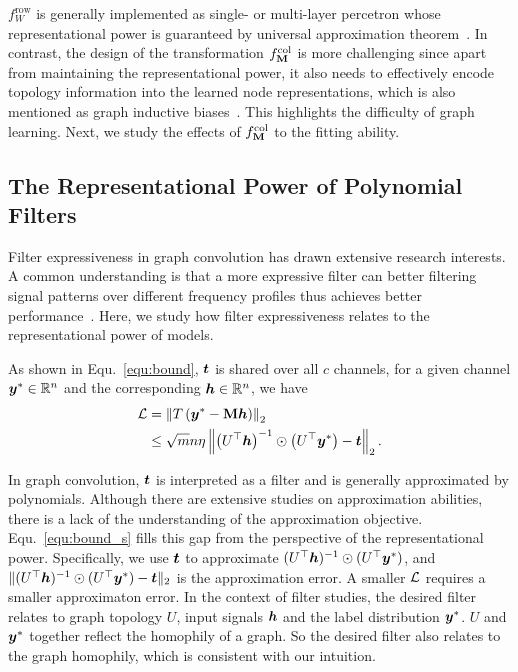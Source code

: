 \documentclass{article} %
\begin{document}
	$f_W^{\mathrm{row}}$ is generally implemented as single- or multi-layer percetron whose representational power is guaranteed by universal approximation theorem~\citep{hornik1989multilayer,cybenko1989approximation}.
	In contrast, the design of the transformation $f_{{\mathbf{M}}}^{\mathrm{col}}$ is more challenging since apart from maintaining the representational power, it also needs to effectively encode topology information into the learned node representations, which is also mentioned as graph inductive biases~\citep{ma2023graph}.
	This highlights the difficulty of graph learning.
	Next, we study the effects of $f_{{\mathbf{M}}}^{\mathrm{col}}$ to the fitting ability.
	
	\subsection{The Representational Power of Polynomial Filters}
	Filter expressiveness in graph convolution has drawn extensive research interests.
	A common understanding is that a more expressive filter can better filtering signal patterns over different frequency profiles thus achieves better performance~\citep{chien2021adaptive,he2021bernnet,JacobiConv,yang2022spectrum,bo2022specformer}.
	Here, we study how filter expressiveness relates to the representational power of models.
	
	As shown in Equ.~\ref{equ:bound}, ${\bm{t}}$ is shared over all $c$ channels, for a given channel ${\bm{y}}^*\in{\mathbb{R}}^n$ and the corresponding ${\bm{h}}\in{\mathbb{R}}^n$, we have
	\begin{equation}
		\label{equ:bound_s}
		\begin{aligned}
			{\mathcal{L}}&=\left\|T\left({\bm{y}}^*-{\mathbf{M}}{\bm{h}}\right)\right\|_2\\
			&\leq\sqrt{m}n\eta\left\|\left(U^{\top}{\bm{h}}\right)^{-1}\odot\left(U^{\top}{\bm{y}}^*\right)-{\bm{t}}\right\|_2.
		\end{aligned}
	\end{equation}
	
	In graph convolution, ${\bm{t}}$ is interpreted as a filter and is generally approximated by polynomials.
	Although there are extensive studies on approximation abilities, there is a lack of the understanding of the approximation objective.
	Equ.~\ref{equ:bound_s} fills this gap from the perspective of the representational power.
	Specifically, we use ${\bm{t}}$ to approximate $(U^{\top}{\bm{h}})^{-1}\odot(U^{\top}{\bm{y}}^*)$, and $\|(U^{\top}{\bm{h}})^{-1}\odot(U^{\top}{\bm{y}}^*)-{\bm{t}}\|_2$ is the approximation error.
	A smaller ${\mathcal{L}}$ requires a smaller approximaton error.
	In the context of filter studies, the desired filter relates to graph topology $U$, input signals ${\bm{h}}$ and the label distribution ${\bm{y}}^*$.
	$U$ and ${\bm{y}}^*$ together reflect the homophily of a graph.
	So the desired filter also relates to the graph homophily, which is consistent with our intuition.
	
\end{document}
